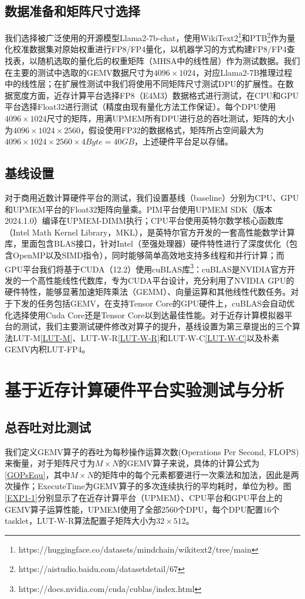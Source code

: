 \subsection{数据准备和矩阵尺寸选择}
我们选择被广泛使用的开源模型Llama2-7b-chat，使用WikiText2\footnote{https://huggingface.co/datasets/mindchain/wikitext2/tree/main}和PTB\footnote{https://aistudio.baidu.com/datasetdetail/67}作为量化校准数据集对原始权重进行FP8/FP4量化，以机器学习的方式构建FP8/FP4查找表，以随机选取的量化后的权重矩阵（MHSA中的线性层）作为测试数据。我们在主要的测试中选取的GEMV数据尺寸为$4096\times 1024$，对应Llama2-7B推理过程中的线性层；在扩展性测试中我们将使用不同矩阵尺寸测试DPU的扩展性。在数据宽度方面，近存计算平台选择FP8（E4M3）数据格式进行测试，在CPU和GPU平台选择Float32进行测试（精度由现有量化方法工作保证）。每个DPU使用$4096\times 1024$尺寸的矩阵，用满UPMEM所有DPU进行总的吞吐测试，矩阵的大小为$4096\times 1024\times 2560$，假设使用FP32的数据格式，矩阵所占空间最大为$4096\times 1024\times 2560\times 4Byte=40GB$，上述硬件平台足以存储。

\subsection{基线设置}
对于商用近数计算硬件平台的测试，我们设置基线（baseline）分别为CPU、GPU和UPMEM平台的Float32矩阵向量乘。PIM平台使用UPMEM SDK（版本 2024.1.0）编译在UPMEM-DIMM执行；CPU平台使用英特尔数学核心函数库（Intel Math Kernel Library，MKL）\cite{IntelMKL}，是英特尔官方开发的一套高性能数学计算库，里面包含BLAS接口，针对Intel（至强处理器）硬件特性进行了深度优化（包含OpenMP以及SIMD指令），同时能够简单高效地支持多线程和并行计算；而GPU平台我们将基于CUDA（12.2）使用cuBLAS库\footnote{https://docs.nvidia.com/cuda/cublas/index.html}：cuBLAS是NVIDIA官方开发的一个高性能线性代数库，专为CUDA平台设计，充分利用了NVIDIA GPU的硬件特性，能够显著加速矩阵乘法（GEMM）、向量运算和其他线性代数任务。对于下发的任务包括GEMV，在支持Tensor Core的GPU硬件上，cuBLAS会自动优化选择使用Cuda Core还是Tensor Core以到达最佳性能。对于近存计算模拟器平台的测试，我们主要测试硬件修改对算子的提升，基线设置为第三章提出的三个算法LUT-M\ref{LUT-M}、LUT-W-R\ref{LUT-W-R}和LUT-W-C\ref{LUT-W-C}以及朴素GEMV内积LUT-FP4。

\section{基于近存计算硬件平台实验测试与分析}

\subsection{总吞吐对比测试}
我们定义GEMV算子的吞吐为每秒操作运算次数(Operations Per Second, FLOPS)来衡量，对于矩阵尺寸为$M\times N$的GEMV算子来说，具体的计算公式为\ref{GOPsEqu}，其中$M\times N$的矩阵中的每个元素都要进行一次乘法和加法，因此是两次操作；ExecuteTime为GEMV算子的多次连续执行的平均耗时，单位为秒。图\ref{EXP1-1}分别显示了在近存计算平台（UPMEM）、CPU平台和GPU平台上的GEMV算子运算性能，UPMEM使用了全部2560个DPU，每个DPU配置16个tasklet，LUT-W-R算法配置子矩阵大小为$32\times 512$。

